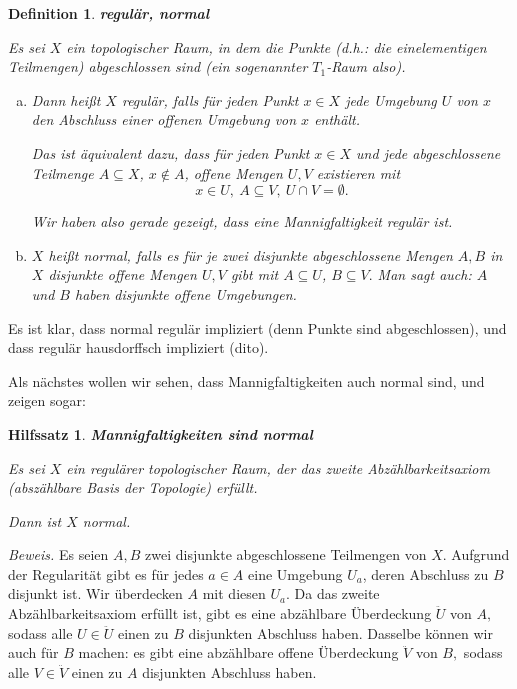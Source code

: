 \documentclass[12pt]{scrbook}   %
\newtheorem{hilfsX}[alles]{Hilfssatz}
\newenvironment{hilfs}[1]{\begin{hilfsX}{\bf #1}\par}{\end{hilfsX}}
\newtheorem{definiX}[alles]{Definition}
\newenvironment{defini}[1]{\begin{definiX}{\bf #1}\par\rm}{\end{definiX}}
\begin{document}
\begin{defini} {regul\"ar, normal}
Es sei $X$ ein topologischer Raum, in dem die Punkte (d.h.: die 
einelementigen Teilmengen) abgeschlossen sind (ein sogenannter $T_1$-Raum also).

\begin{enumerate}[a)]
\item
Dann hei\ss t $X$ {\it regul\"ar}, falls f\"ur jeden Punkt
$x\in X$ jede Umgebung $U$ von $x$ den Abschluss einer offenen Umgebung von $x$
enth\"alt. 

Das ist \"aquivalent dazu, dass f\"ur jeden Punkt $x\in X$ und jede 
abgeschlossene Teilmenge $A\subseteq X$, $x\notin A$, offene Mengen $U,V$ existieren mit
$$x\in U,\ A\subseteq V,\ U\cap V = \emptyset.$$

Wir haben also gerade gezeigt, dass eine Mannigfaltigkeit regul\"ar
ist.

\item
$X$ hei\ss t {\it normal}, falls es f\"ur je zwei disjunkte
abgeschlossene Mengen $A,B$ in $X$ disjunkte offene Mengen $U,V$ gibt mit
$A\subseteq U$, $B\subseteq V.$ Man sagt auch: $A$ und $B$ haben disjunkte 
offene Umgebungen.
\end{enumerate}
\end{defini}
Es ist klar, dass normal regul\"ar impliziert (denn Punkte sind abgeschlossen),
und dass regul\"ar hausdorffsch impliziert (dito).

Als n\"achstes wollen wir sehen, dass Mannigfaltigkeiten auch normal sind, und 
zeigen sogar:

\begin{hilfs} {Mannigfaltigkeiten sind normal}
Es sei $X$ ein regul\"arer topologischer Raum, der das zweite 
Abz\"ahlbarkeitsaxiom (abszählbare Basis der Topologie) erf\"ullt.

Dann ist $X$ normal.
\end{hilfs}

{\it Beweis.}
Es seien $A,B$ zwei disjunkte abgeschlossene Teilmengen von $X.$ Aufgrund der
Regularit\"at gibt es f\"ur jedes $a\in A$ eine Umgebung $U_a$, deren 
Abschluss zu $B$ disjunkt ist. Wir \"uberdecken $A$ mit diesen $U_a.$ Da das
zweite Abz\"ahlbarkeitsaxiom erf\"ullt ist, gibt es eine abz\"ahlbare 
\"Uberdeckung $\ddot U$ von $A,$ sodass alle $U\in\ddot U$ einen zu $B$ 
disjunkten Abschluss haben. Dasselbe k\"onnen wir auch f\"ur $B$ machen: es 
gibt eine abz\"ahlbare offene \"Uberdeckung $\ddot V$ von $B,$ sodass alle
$V\in \ddot V$ einen zu $A$ disjunkten Abschluss haben.
\end{document}
